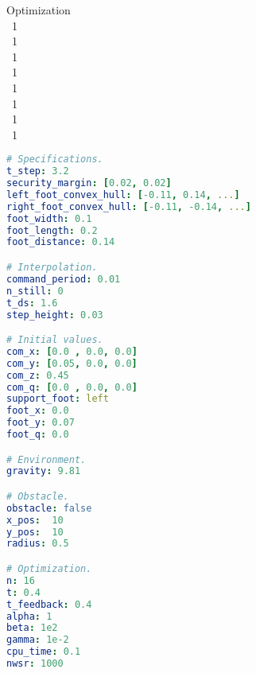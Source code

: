 \begin{minipage}{1.\textwidth}
\begin{minipage}{0.3\textwidth}
{			\hfill Optimization\\
			\mbox{}~\hfill 1\\
			\mbox{}~\hfill 1\\
			\mbox{}~\hfill 1\\
			\mbox{}~\hfill 1\\
			\mbox{}~\hfill 1\\
			\mbox{}~\hfill 1\\
			\mbox{}~\hfill 1\\
			\mbox{}~\hfill 1}
	\end{minipage}
	\begin{minipage}{0.7\textwidth}
		\begin{lstlisting}[language=yaml]
# Specifications.
t_step: 3.2
security_margin: [0.02, 0.02]
left_foot_convex_hull: [-0.11, 0.14, ...]
right_foot_convex_hull: [-0.11, -0.14, ...]
foot_width: 0.1
foot_length: 0.2
foot_distance: 0.14

# Interpolation.
command_period: 0.01
n_still: 0
t_ds: 1.6
step_height: 0.03

# Initial values.
com_x: [0.0 , 0.0, 0.0]
com_y: [0.05, 0.0, 0.0]
com_z: 0.45
com_q: [0.0 , 0.0, 0.0]
support_foot: left
foot_x: 0.0
foot_y: 0.07
foot_q: 0.0

# Environment.
gravity: 9.81

# Obstacle.
obstacle: false
x_pos:  10
y_pos:  10
radius: 0.5

# Optimization.
n: 16
t: 0.4
t_feedback: 0.4
alpha: 1
beta: 1e2
gamma: 1e-2
cpu_time: 0.1
nwsr: 1000
		\end{lstlisting}
	\end{minipage}
\end{minipage}
\cite{eigenweb} %
\cite{ferreau2014qpoases} %
\cite{felis2017rbdl} %
\cite{googletest} %
\cite{opencv_library}
\cite{paszke2017automatic} %
